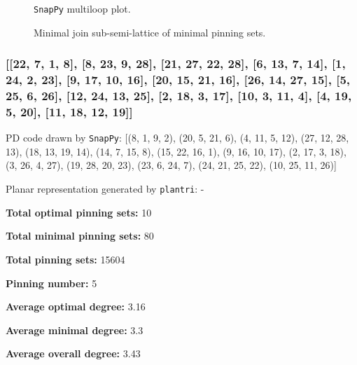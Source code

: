 \documentclass{article}%
\begin{document}
\begin{multicols}{2}
\begin{figure}[H]
\centering

\caption{\texttt{SnapPy} multiloop plot.}
\label{fig:tex/img/[[6, 20, 1, 7], [7, 21, 8, 28], [15, 5, 16, 6], [19, 22, 20, 23], [1, 22, 2, 21], [8, 2, 9, 3], [14, 27, 15, 28], [4, 26, 5, 27], [16, 12, 17, 11], [23, 11, 24, 10], [18, 9, 19, 10], [3, 13, 4, 14], [.svg}
\end{figure}
\columnbreak

\begin{figure}[H]
\centering
\scalebox{0.8}{}
\caption{Minimal join sub-semi-lattice of minimal pinning sets.}
\label{fig:tex/img/[[6, 20, 1, 7], [7, 21, 8, 28], [15, 5, 16, 6], [19, 22, 20, 23], [1, 22, 2, 21], [8, 2, 9, 3], [14, 27, 15, 28], [4, 26, 5, 27], [16, 12, 17, 11], [23, 11, 24, 10], [18, 9, 19, 10], [3, 13, 4, 14], [.pgf}
\end{figure}
\end{multicols}

\newpage

\subsubsection{[[22, 7, 1, 8], [8, 23, 9, 28], [21, 27, 22, 28], [6, 13, 7, 14], [1, 24, 2, 23], [9, 17, 10, 16], [20, 15, 21, 16], [26, 14, 27, 15], [5, 25, 6, 26], [12, 24, 13, 25], [2, 18, 3, 17], [10, 3, 11, 4], [4, 19, 5, 20], [11, 18, 12, 19]]}

{\small\noindent PD code drawn by \texttt{SnapPy}: [(8, 1, 9, 2), (20, 5, 21, 6), (4, 11, 5, 12), (27, 12, 28, 13), (18, 13, 19, 14), (14, 7, 15, 8), (15, 22, 16, 1), (9, 16, 10, 17), (2, 17, 3, 18), (3, 26, 4, 27), (19, 28, 20, 23), (23, 6, 24, 7), (24, 21, 25, 22), (10, 25, 11, 26)]}

{\small\noindent Planar representation generated by \texttt{plantri}: -}

\begin{multicols}{2}
{\normalsize \noindent\textbf{Total optimal pinning sets:} 10

\noindent\textbf{Total minimal pinning sets:} 80

\noindent\textbf{Total pinning sets:} 15604

\noindent\textbf{Pinning number:} 5

}
\columnbreak

{\normalsize \noindent\textbf{Average optimal degree:} 3.16

\noindent\textbf{Average minimal degree:} 3.3

\noindent\textbf{Average overall degree:} 3.43

}
\end{multicols}
\end{document}
